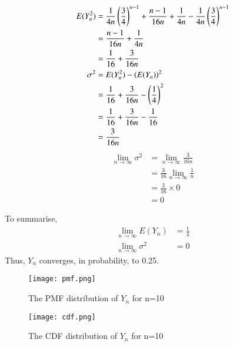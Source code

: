 \documentclass[journal,12pt,twocolumn]{IEEEtran}
\begin{document}
\begin{align}
    E(Y_n^2) &= \frac{1}{4n}\left(\frac{3}{4}\right)^{n-1} + \frac{n-1}{16n} +\frac{1}{4n} - \frac{1}{4n}\left(\frac{3}{4}\right)^{n-1}
    \\ &= \frac{n-1}{16n} +\frac{1}{4n}
    \\ &= \frac{1}{16} + \frac{3}{16n}
    \\\sigma ^{2} &= E(Y_n^2) - \left(E(Y_n)\right)^2
    \\ &= \frac{1}{16} + \frac{3}{16n} - \left(\frac{1}{4}\right)^2
    \\ &= \frac{1}{16} + \frac{3}{16n} - \frac{1}{16} 
    \\ &= \frac{3}{16n}
\end{align}
\begin{align}
     \lim_{n\rightarrow\infty}  \sigma ^{2} &=  \lim_{n\rightarrow\infty}  \frac{3}{16n} 
     \\ &= \frac{3}{16} \lim_{n\rightarrow\infty} \frac{1}{n}
     \\ &=  \frac{3}{16} \times 0
     \\ &= 0
\end{align}

To summarise,
\begin{align}
    \lim_{n\rightarrow \infty} E(Y_n) &= \frac{1}{4}
    \\\lim_{n\rightarrow\infty}  \sigma ^{2} &= 0
\end{align}
Thus, $Y_n$ converges, in probability, to 0.25. 
\begin{figure} [H]
    \texttt{[image: pmf.png]}
    \caption{The PMF distribution of $Y_n$ for n=10}
    \label{Fig 1}
\end{figure}
\begin{figure} [H]
    \texttt{[image: cdf.png]}
    \caption{The CDF distribution of $Y_n$ for n=10}
    \label{Fig 2}
\end{figure}
\end{document}
